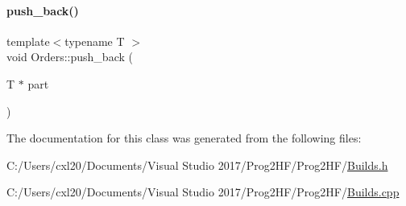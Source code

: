 \paragraph{\texorpdfstring{push\_back()}{push\_back()}}
{\footnotesize\ttfamily template$<$typename T $>$ \\
void Orders\+::push\+\_\+back (\begin{DoxyParamCaption}\item[{T $\ast$}]{part }\end{DoxyParamCaption})}



The documentation for this class was generated from the following files\+:\begin{DoxyCompactItemize}
\item 
C\+:/\+Users/cxl20/\+Documents/\+Visual Studio 2017/\+Prog2\+H\+F/\+Prog2\+H\+F/\mbox{\hyperlink{_builds_8h}{Builds.\+h}}\item 
C\+:/\+Users/cxl20/\+Documents/\+Visual Studio 2017/\+Prog2\+H\+F/\+Prog2\+H\+F/\mbox{\hyperlink{_builds_8cpp}{Builds.\+cpp}}\end{DoxyCompactItemize}
